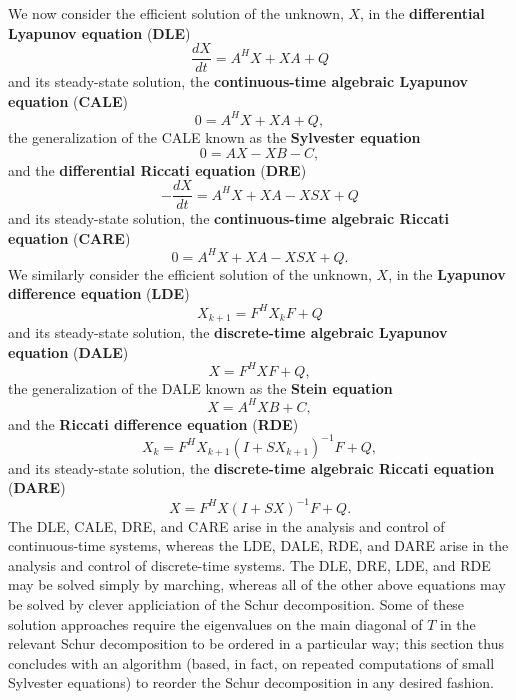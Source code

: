 We now consider the efficient solution of the unknown, $X$, in the {\bf differential Lyapunov equation} ({\bf DLE})
\begin{equation*}
\frac{dX}{dt} = A^H X + X A + Q
\end{equation*}
and its steady-state solution, the {\bf continuous-time algebraic Lyapunov equation} ({\bf CALE})
\begin{equation*}
0 = A^H X + X A + Q,
\end{equation*}
the generalization of the CALE known as the {\bf Sylvester equation}
\begin{equation*}
0= A X - X B - C,
\end{equation*}
and the {\bf differential Riccati equation} ({\bf DRE})
\begin{equation*}
- \frac{d X}{dt} = A^H X + X A - X S X + Q
\end{equation*}
and its steady-state solution, the {\bf continuous-time algebraic Riccati equation} ({\bf CARE})
\begin{equation*}
0 = A^H X + X A - X S X + Q.
\end{equation*}
We similarly consider the efficient solution of the unknown, $X$, in the {\bf Lyapunov difference equation} ({\bf LDE})
\begin{equation*}
X_{k+1} = F^H X_k F + Q
\end{equation*}
and its steady-state solution, the {\bf discrete-time algebraic Lyapunov equation} ({\bf DALE})
\begin{equation*}
X = F^H X F + Q,
\end{equation*}
the generalization of the DALE known as the {\bf Stein equation}
\begin{equation*}
X = A^H X B + C,
\end{equation*}
and the {\bf Riccati difference equation} ({\bf RDE})
\begin{equation*}
  X_k = F^H X_{k+1} (I+ S X_{k+1})^{-1} F + Q, 
\end{equation*}
and its steady-state solution, the {\bf discrete-time algebraic Riccati equation} ({\bf DARE})
\begin{equation*}
X = F^H X (I+ S X)^{-1} F + Q.
\end{equation*}
The DLE, CALE, DRE, and CARE arise in the analysis and control of continuous-time systems, whereas
the LDE, DALE, RDE, and DARE arise in the analysis and control of discrete-time systems.
The DLE, DRE, LDE, and RDE may be solved simply by marching, whereas all of the other above equations may be solved by clever appliciation
of the Schur decomposition. Some of these solution approaches require the eigenvalues on the main diagonal of $T$ in
the relevant Schur decomposition to be ordered in a particular way; this section thus concludes with an algorithm (based, in fact, on
repeated computations of small Sylvester equations) to reorder the Schur decomposition in any desired fashion.

